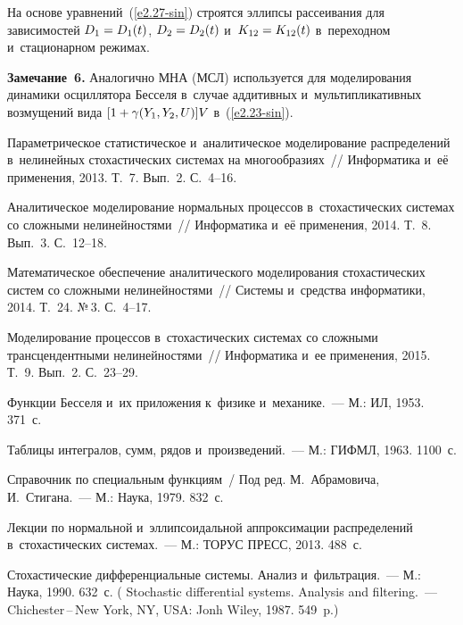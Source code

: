 \begin{multicols}{2}
{На основе уравнений~(\ref{e2.27-sin}) 
строятся эллипсы рассеивания для зависимостей
$D_1 \hm= D_1 (t)$, $D_2\hm = D_2 (t)$ и~$K_{12}\hm = K_{12} (t)$ 
в~переходном и~стационарном режимах.

\noindent
\textbf{Замечание~6.}
Аналогично МНА (МСЛ) используется для моделирования динамики осциллятора Бесселя 
в~случае аддитивных и~мультипликативных возмущений вида 
$[ 1\hm+\gamma (Y_1, Y_2, U)]V$ в~(\ref{e2.23-sin}).



}


{\small\frenchspacing
{%
\begin{thebibliography}{99}
Параметрическое статистическое и~аналитическое моделирование распределений 
в~нелинейных стохастических системах на многообразиях~// 
Информатика и~её применения, 2013. Т.~7. Вып.~2. С.~4--16.

Аналитическое моделирование нормальных процессов 
в~стохастических системах со сложными нелинейностями~// Информатика и~её 
применения, 2014. Т.~8. Вып.~3. С.~12--18.

Математическое обеспечение аналитического моделирования стохастических сис\-тем 
со сложными нелинейностями~// Системы и~средства информатики, 2014. 
Т.~24. №\,3. С.~4--17.

Моделирование процессов в~стохастических системах 
со сложными трансцендентными нелинейностями~// Информатика и~ее применения, 2015. 
Т.~9. Вып.~2. С.~23--29.

Функции Бесселя и~их приложения к~физике и~механике.~--- 
М.: ИЛ, 1953. 371~с.

Таблицы интегралов, сумм, рядов и~произведений.~--- М.: ГИФМЛ, 1963. 1100~с.

Справочник по специальным функциям~/ Под ред. М.~Абрамовича, И.~Стигана.~--- 
М.: Наука, 1979. 832~с.

Лекции по нормальной и~эллипсоидальной аппроксимации распределений 
в~стохастических системах.~--- М.: ТОРУС ПРЕСС, 2013. 488~с.

Стохастические дифференциальные системы. Анализ и~фильтрация.~--- М.:
Наука,  1990.  632~с. (
Stochastic differential systems.
Analysis and filtering.~--- Chichester\,--\,New York, NY, USA: Jonh Wiley, 1987.
549~p.)


\end{thebibliography}}}
\end{multicols}
